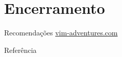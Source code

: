 \section{Encerramento}
\begin{frame}{Recomendações}
    \hyperlink{https://vim-adventures.com/}{vim-adventures.com}

    \vfill
    

    \vfill

\end{frame}

\begin{frame}[t]{Referência}
    \nocite{*}
    
    
\end{frame}
